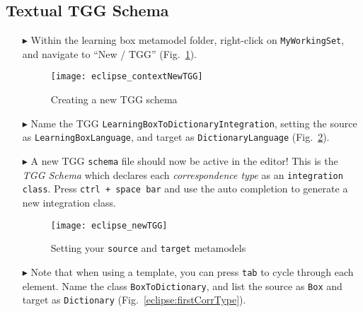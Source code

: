 \newpage
\hypertarget{schema tex}{}
\subsection{Textual TGG Schema}
\texHeader

\begin{itemize}

\item[$\blacktriangleright$] Within the learning box metamodel folder, right-click on \texttt{MyWorkingSet}, and navigate to ``New / TGG''
(Fig.~\ref{eclipse:contextTGG}).

\vspace{0.5cm}

\begin{figure}[htbp]
\begin{center}
  \texttt{[image: eclipse\_contextNewTGG]}
  \caption{Creating a new TGG schema}
  \label{eclipse:contextTGG}
\end{center}
\end{figure}

\item[$\blacktriangleright$] Name the TGG \texttt{LearningBoxToDictionaryIntegration}, setting the source as \texttt{LearningBoxLanguage}, and target as
\texttt{DictionaryLanguage} (Fig.~\ref{eclipse:newTGG}).

\vspace{0.5cm}

\item[$\blacktriangleright$] A new TGG \texttt{schema} file should now be active in the editor! This is the \emph{TGG Schema} which declares each
\emph{correspondence type} as an \texttt{integration class}. Press \texttt{ctrl + space bar} and use the auto completion to generate a new integration class.

\newpage

\begin{figure}[htbp]
\begin{center}
  \texttt{[image: eclipse\_newTGG]}
  \caption{Setting your \texttt{source} and \texttt{target} metamodels}
  \label{eclipse:newTGG}
\end{center}
\end{figure}

\item[$\blacktriangleright$] Note that when using a template, you can press \texttt{tab} to cycle through each element. Name the class
\texttt{BoxToDictionary}, and list the source as \texttt{Box} and target as \texttt{Dictionary} (Fig.~\ref{eclipse:firstCorrType}). 


\end{itemize}
